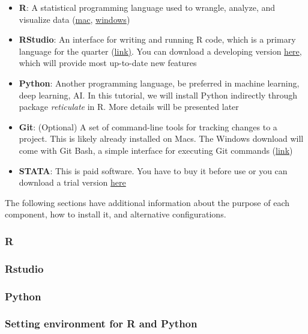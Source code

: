 \documentclass[
]{article}
\begin{document}
\begin{itemize}
\item
  \textbf{R}: A statistical programming language used to wrangle, analyze, and visualize data (\href{https://cran.r-project.org/bin/macosx/}{mac}, \href{https://cran.r-project.org/bin/windows/base/}{windows})
\item
  \textbf{RStudio}: An interface for writing and running R code, which is a primary language for the quarter (\href{https://www.rstudio.com/products/rstudio/download/}{link)}. You can download a developing version \href{https://dailies.rstudio.com/}{here}, which will provide most up-to-date new features
\item
  \textbf{Python}: Another programming language, be preferred in machine learning, deep learning, AI. In this tutorial, we will install Python indirectly through package \emph{reticulate} in R. More details will be presented later
\item
  \textbf{Git}: (Optional) A set of command-line tools for tracking changes to a project. This is likely already installed on Macs. The Windows download will come with Git Bash, a simple interface for executing Git commands (\href{https://git-scm.com/downloads}{link})
\item
  \textbf{STATA}: This is paid software. You have to buy it before use or you can download a trial version \href{https://www.stata.com/customer-service/evaluate-stata/}{here}
\end{itemize}

The following sections have additional information about the purpose of each component, how to install it, and alternative configurations.

\hypertarget{r}{%
\subsubsection{R}\label{r}}

\hypertarget{rstudio}{%
\subsubsection{Rstudio}\label{rstudio}}

\hypertarget{python}{%
\subsubsection{Python}\label{python}}

\hypertarget{setting-environment-for-r-and-python}{%
\subsubsection{Setting environment for R and Python}\label{setting-environment-for-r-and-python}}
\end{document}
